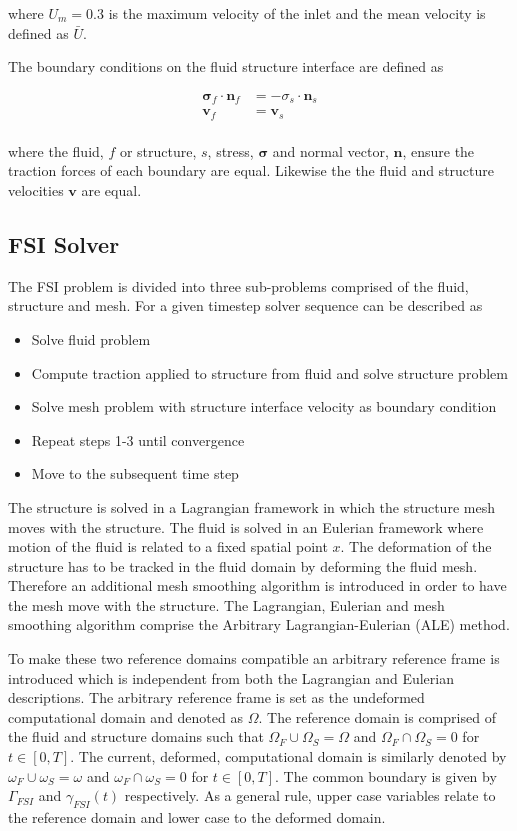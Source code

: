 \documentclass{article}
\begin{document}
where $U_m = 0.3$ is the maximum velocity of the inlet and the mean velocity is defined as $\bar{U}$. 

The boundary conditions on the fluid structure interface are defined as

\begin{align}
\mathbf{\sigma}_f \cdot \mathbf{n}_f &= -\sigma_s \cdot \mathbf{n}_s\\
 \mathbf{v}_f &= \mathbf{v}_s \\
\end{align}


where the fluid, $f$ or structure, $s$, stress, $\mathbf{\sigma}$ and normal vector, $\mathbf{n}$, ensure the traction forces of each boundary are equal. Likewise the the fluid and structure velocities $\mathbf{v}$ are equal. 

\subsection{FSI Solver}

The FSI problem is divided into three sub-problems comprised of the fluid, structure and mesh. For a given timestep solver sequence can be described as

\begin{itemize}
\item Solve fluid problem 
\item Compute traction applied to structure from fluid and solve structure problem
\item Solve mesh problem with structure interface velocity as boundary condition
\item Repeat steps 1-3 until convergence
\item Move to the subsequent time step
\end{itemize}



The structure is solved in a Lagrangian framework in which the structure mesh moves with the structure. The fluid is solved in an Eulerian framework where motion of the fluid is related to a fixed spatial point $x$. The deformation of the structure has to be tracked in the fluid domain by deforming the fluid mesh. Therefore an additional mesh smoothing algorithm is introduced in order to have the mesh move with the structure. The Lagrangian, Eulerian and mesh smoothing algorithm comprise the Arbitrary Lagrangian-Eulerian (ALE) method. 

To make these two reference domains compatible an arbitrary reference frame is introduced which is independent from both the Lagrangian and Eulerian descriptions. The arbitrary reference frame is set as the undeformed computational domain and denoted as $\Omega$. The reference domain is comprised of the fluid and structure domains such that $\Omega_F \cup \Omega_S = \Omega$ and $\Omega_F \cap \Omega_S = 0$ for $ t \in [0,T]$. 
The current, deformed, computational domain is similarly denoted by $\omega_F \cup \omega_S = \omega$ and $\omega_F \cap \omega_S = 0$ for $ t \in [0,T]$. The common boundary is given by $\Gamma_{FSI}$ and $\gamma_{FSI}(t)$ respectively. As a general rule, upper case variables relate to the reference domain and lower case to the deformed domain. 
\end{document}
